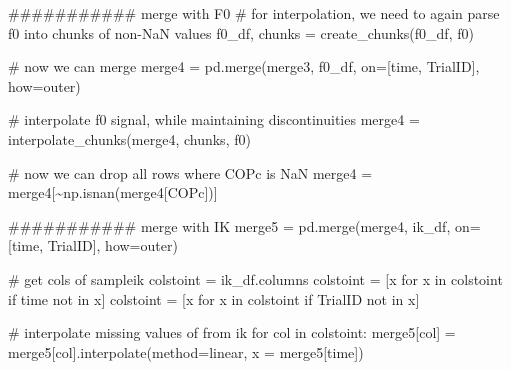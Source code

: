 \documentclass[
  letterpaper,
  DIV=11,
  numbers=noendperiod]{scrreprt}
\newenvironment{Shaded}{\begin{snugshade}}{\end{snugshade}}
\newcommand{\CommentTok}[1]{\textcolor[rgb]{0.37,0.37,0.37}{#1}}
\newcommand{\ControlFlowTok}[1]{\textcolor[rgb]{0.00,0.23,0.31}{#1}}
\newcommand{\KeywordTok}[1]{\textcolor[rgb]{0.00,0.23,0.31}{#1}}
\newcommand{\NormalTok}[1]{\textcolor[rgb]{0.00,0.23,0.31}{#1}}
\newcommand{\OperatorTok}[1]{\textcolor[rgb]{0.37,0.37,0.37}{#1}}
\newcommand{\StringTok}[1]{\textcolor[rgb]{0.13,0.47,0.30}{#1}}
\begin{document}
\begin{Shaded}
\begin{Highlighting}[]
    \CommentTok{\#\#\#\#\#\#\#\#\#\#\# merge with F0}
    \CommentTok{\# for interpolation, we need to again parse f0 into chunks of non{-}NaN values}
\NormalTok{    f0\_df, chunks }\OperatorTok{=}\NormalTok{ create\_chunks(f0\_df, }\StringTok{\textquotesingle{}f0\textquotesingle{}}\NormalTok{)}
    
    \CommentTok{\# now we can merge}
\NormalTok{    merge4 }\OperatorTok{=}\NormalTok{ pd.merge(merge3, f0\_df, on}\OperatorTok{=}\NormalTok{[}\StringTok{\textquotesingle{}time\textquotesingle{}}\NormalTok{, }\StringTok{\textquotesingle{}TrialID\textquotesingle{}}\NormalTok{], how}\OperatorTok{=}\StringTok{\textquotesingle{}outer\textquotesingle{}}\NormalTok{)}


    \CommentTok{\# interpolate f0 signal, while maintaining discontinuities}
\NormalTok{    merge4 }\OperatorTok{=}\NormalTok{ interpolate\_chunks(merge4, chunks, }\StringTok{\textquotesingle{}f0\textquotesingle{}}\NormalTok{)}

    \CommentTok{\# now we can drop all rows where COPc is NaN}
\NormalTok{    merge4 }\OperatorTok{=}\NormalTok{ merge4[}\OperatorTok{\textasciitilde{}}\NormalTok{np.isnan(merge4[}\StringTok{\textquotesingle{}COPc\textquotesingle{}}\NormalTok{])]}

    \CommentTok{\#\#\#\#\#\#\#\#\#\#\# merge with IK}
\NormalTok{    merge5 }\OperatorTok{=}\NormalTok{ pd.merge(merge4, ik\_df, on}\OperatorTok{=}\NormalTok{[}\StringTok{\textquotesingle{}time\textquotesingle{}}\NormalTok{, }\StringTok{\textquotesingle{}TrialID\textquotesingle{}}\NormalTok{], how}\OperatorTok{=}\StringTok{\textquotesingle{}outer\textquotesingle{}}\NormalTok{)}

    \CommentTok{\# get cols of sampleik}
\NormalTok{    colstoint }\OperatorTok{=}\NormalTok{ ik\_df.columns}
\NormalTok{    colstoint }\OperatorTok{=}\NormalTok{ [x }\ControlFlowTok{for}\NormalTok{ x }\KeywordTok{in}\NormalTok{ colstoint }\ControlFlowTok{if} \StringTok{\textquotesingle{}time\textquotesingle{}} \KeywordTok{not} \KeywordTok{in}\NormalTok{ x]}
\NormalTok{    colstoint }\OperatorTok{=}\NormalTok{ [x }\ControlFlowTok{for}\NormalTok{ x }\KeywordTok{in}\NormalTok{ colstoint }\ControlFlowTok{if} \StringTok{\textquotesingle{}TrialID\textquotesingle{}} \KeywordTok{not} \KeywordTok{in}\NormalTok{ x]}

    \CommentTok{\# interpolate missing values of from ik}
    \ControlFlowTok{for}\NormalTok{ col }\KeywordTok{in}\NormalTok{ colstoint:}
\NormalTok{        merge5[col] }\OperatorTok{=}\NormalTok{ merge5[col].interpolate(method}\OperatorTok{=}\StringTok{\textquotesingle{}linear\textquotesingle{}}\NormalTok{, x }\OperatorTok{=}\NormalTok{ merge5[}\StringTok{\textquotesingle{}time\textquotesingle{}}\NormalTok{])}


\end{Highlighting}
\end{Shaded}
\end{document}

